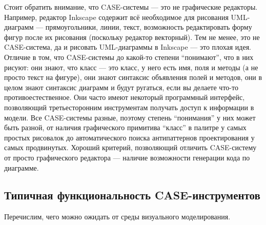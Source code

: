 \documentclass[a5paper]{article}
\begin{document}
Стоит обратить внимание, что CASE-системы --- это не графические редакторы. Например, редактор Inkscape содержит всё необходимое для рисования UML-диаграмм --- прямоугольники, линии, текст, возможность редактировать форму фигур после их рисования (поскольку редактор векторный). Тем не менее, это не CASE-система, да и рисовать UML-диаграммы в Inkscape --- это плохая идея. Отличие в том, что CASE-системы до какой-то степени ``понимают'', что в них рисуют: они знают, что класс --- это класс, у него есть имя, поля и методы (а не просто текст на фигуре), они знают синтаксис объявления полей и методов, они в целом знают синтаксис диаграмм и будут ругаться, если вы делаете что-то противоестественное. Они часто имеют некоторый программный интерфейс, позволяющий третьесторонним инструментам получать доступ к информации в модели. Все CASE-системы разные, поэтому степень ``понимания'' у них может быть разной, от наличия графического примитива ``класс'' в палитре у самых простых рисовалок до автоматического поиска антипаттернов проектирования у самых продвинутых. Хороший критерий, позволяющий отличить CASE-систему от просто графического редактора --- наличие возможности генерации кода по диаграмме.

\subsection{Типичная функциональность CASE-инструментов}

Перечислим, чего можно ожидать от среды визуального моделирования.
\end{document}
